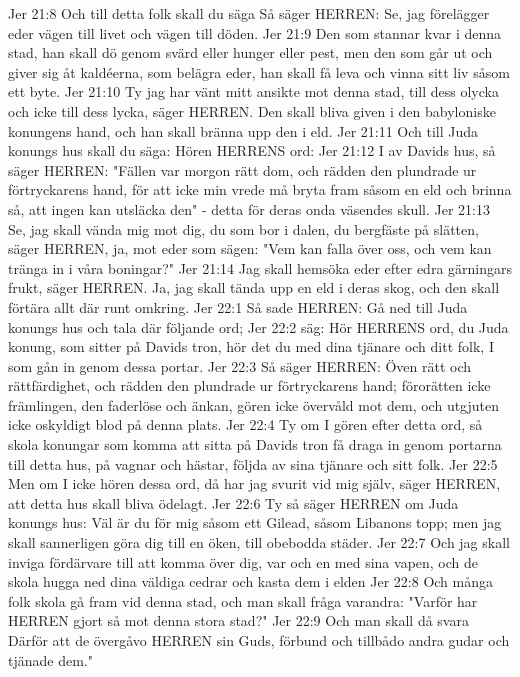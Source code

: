 Jer 21:8  Och till detta folk skall du säga Så säger HERREN: Se, jag förelägger eder vägen till livet och vägen till döden.
Jer 21:9  Den som stannar kvar i denna stad, han skall dö genom svärd eller hunger eller pest, men den som går ut och giver sig åt kaldéerna, som belägra eder, han skall få leva och vinna sitt liv såsom ett byte.
Jer 21:10  Ty jag har vänt mitt ansikte mot denna stad, till dess olycka och icke till dess lycka, säger HERREN. Den skall bliva given i den babyloniske konungens hand, och han skall bränna upp den i eld.
Jer 21:11  Och till Juda konungs hus skall du säga: Hören HERRENS ord:
Jer 21:12  I av Davids hus, så säger HERREN: "Fällen var morgon rätt dom, och rädden den plundrade ur förtryckarens hand, för att icke min vrede må bryta fram såsom en eld och brinna så, att ingen kan utsläcka den" - detta för deras onda väsendes skull.
Jer 21:13  Se, jag skall vända mig mot dig, du som bor i dalen, du bergfäste på slätten, säger HERREN, ja, mot eder som sägen: "Vem kan falla över oss, och vem kan tränga in i våra boningar?"
Jer 21:14  Jag skall hemsöka eder efter edra gärningars frukt, säger HERREN. Ja, jag skall tända upp en eld i deras skog, och den skall förtära allt där runt omkring.
Jer 22:1  Så sade HERREN: Gå ned till Juda konungs hus och tala där följande ord;
Jer 22:2  säg: Hör HERRENS ord, du Juda konung, som sitter på Davids tron, hör det du med dina tjänare och ditt folk, I som gån in genom dessa portar.
Jer 22:3  Så säger HERREN: Öven rätt och rättfärdighet, och rädden den plundrade ur förtryckarens hand; förorätten icke främlingen, den faderlöse och änkan, gören icke övervåld mot dem, och utgjuten icke oskyldigt blod på denna plats.
Jer 22:4  Ty om I gören efter detta ord, så skola konungar som komma att sitta på Davids tron få draga in genom portarna till detta hus, på vagnar och hästar, följda av sina tjänare och sitt folk.
Jer 22:5  Men om I icke hören dessa ord, då har jag svurit vid mig själv, säger HERREN, att detta hus skall bliva ödelagt.
Jer 22:6  Ty så säger HERREN om Juda konungs hus: Väl är du för mig såsom ett Gilead, såsom Libanons topp; men jag skall sannerligen göra dig till en öken, till obebodda städer.
Jer 22:7  Och jag skall inviga fördärvare till att komma över dig, var och en med sina vapen, och de skola hugga ned dina väldiga cedrar och kasta dem i elden
Jer 22:8  Och många folk skola gå fram vid denna stad, och man skall fråga varandra: "Varför har HERREN gjort så mot denna stora stad?"
Jer 22:9  Och man skall då svara Därför att de övergåvo HERREN sin Guds, förbund och tillbådo andra gudar och tjänade dem."
